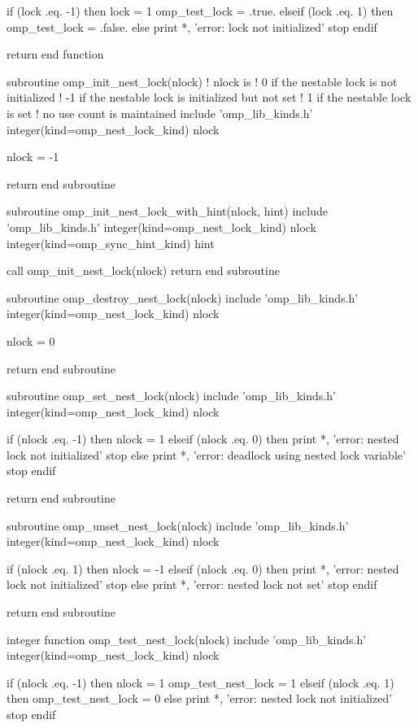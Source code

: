 {\begin{ompfFunction}
  if (lock .eq. -1) then
    lock = 1
    omp_test_lock = .true.
  elseif (lock .eq. 1) then
    omp_test_lock = .false.
  else
    print *, 'error: lock not initialized'
    stop
  endif

  return
end function

subroutine omp_init_nest_lock(nlock)
  ! nlock is
  ! 0 if the nestable lock is not initialized
  ! -1 if the nestable lock is initialized but not set
  ! 1 if the nestable lock is set
  ! no use count is maintained
  include 'omp_lib_kinds.h'
  integer(kind=omp_nest_lock_kind) nlock

  nlock = -1

  return
end subroutine

subroutine omp_init_nest_lock_with_hint(nlock, hint)
  include 'omp_lib_kinds.h'
  integer(kind=omp_nest_lock_kind) nlock
  integer(kind=omp_sync_hint_kind) hint

  call omp_init_nest_lock(nlock)
  return
end subroutine

subroutine omp_destroy_nest_lock(nlock)
  include 'omp_lib_kinds.h'
  integer(kind=omp_nest_lock_kind) nlock

  nlock = 0

  return
end subroutine

subroutine omp_set_nest_lock(nlock)
  include 'omp_lib_kinds.h'
  integer(kind=omp_nest_lock_kind) nlock

  if (nlock .eq. -1) then
    nlock = 1
  elseif (nlock .eq. 0) then
    print *, 'error: nested lock not initialized'
    stop
  else
    print *, 'error: deadlock using nested lock variable'
    stop
  endif

  return
end subroutine

subroutine omp_unset_nest_lock(nlock)
  include 'omp_lib_kinds.h'
  integer(kind=omp_nest_lock_kind) nlock

  if (nlock .eq. 1) then
    nlock = -1
  elseif (nlock .eq. 0) then
    print *, 'error: nested lock not initialized'
    stop
  else
    print *, 'error: nested lock not set'
    stop
  endif

  return
end subroutine

integer function omp_test_nest_lock(nlock)
  include 'omp_lib_kinds.h'
  integer(kind=omp_nest_lock_kind) nlock

  if (nlock .eq. -1) then
    nlock = 1
    omp_test_nest_lock = 1
  elseif (nlock .eq. 1) then
    omp_test_nest_lock = 0
  else
    print *, 'error: nested lock not initialized'
    stop
  endif


\end{ompfFunction}}
